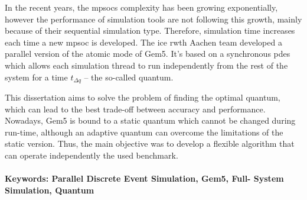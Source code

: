





In the recent years, the \glspl{mpsoc} complexity has been growing exponentially, however the performance of simulation tools are not following this growth, mainly because of their sequential simulation type. Therefore, simulation time increases each time a new \gls{mpsoc} is developed. The \gls{ice} \gls{rwth} Aachen team developed a parallel version of the atomic mode of Gem5. It’s based on a synchronous \gls{pdes} which allows each simulation thread to run independently from the rest of the system for a time $t_{\Delta q}$ – the so-called quantum.

This dissertation aims to solve the problem of finding the optimal quantum, which can lead to the best trade-off between accuracy and performance. Nowadays, Gem5 is bound to a static quantum which cannot be changed during run-time, although an adaptive quantum can overcome the limitations of the static version. Thus, the main objective was to develop a flexible algorithm that can operate independently the used benchmark.  


\paragraph{}\textbf{Keywords: Parallel Discrete Event Simulation, Gem5, Full-
System Simulation, Quantum}
\begin{comment}
\glsreset{FPGA}
\end{comment}

